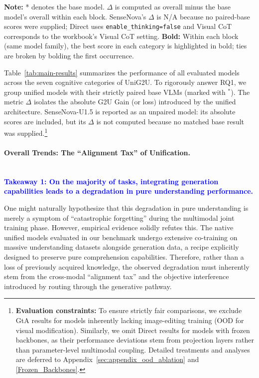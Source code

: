 \documentclass{article}
\theoremstyle{plain}
\theoremstyle{definition}
\theoremstyle{remark}
\begin{document}
\begin{table}[!t]
\vspace{2pt}

{\scriptsize \textbf{Note:} * denotes the base model. $\Delta$ is computed as overall minus the base model's overall within each block. SenseNova's $\Delta$ is N/A because no paired-base scores were supplied; Direct uses \texttt{enable\_thinking=false} and Visual CoT corresponds to the workbook's Visual CoT setting.}
{\scriptsize \textbf{Bold:} Within each block (same model family), the best score in each category is highlighted in bold; ties are broken by bolding the first occurrence.}
\end{table}


Table~\ref{tab:main-results} summarizes the performance of all evaluated models across the seven cognitive categories of UniG2U. To rigorously answer RQ1, we group unified models with their strictly paired base VLMs (marked with $^*$). The metric $\Delta$ isolates the absolute G2U Gain (or loss) introduced by the unified architecture. SenseNova-U1.5 is reported as an unpaired model: its absolute scores are included, but its $\Delta$ is not computed because no matched base result was supplied.\footnote{\textbf{Evaluation constraints:} To ensure strictly fair comparisons, we exclude GtA results for models inherently lacking image-editing training (OOD for visual modification). Similarly, we omit Direct results for models with frozen backbones, as their performance deviations stem from projection layers rather than parameter-level multimodal coupling. Detailed treatments and analyses are deferred to Appendix~\ref{sec:appendix_ood_ablation} and \ref{Frozen_Backbones}.}

\paragraph{Overall Trends: The ``Alignment Tax'' of Unification.} 
~\\
\textbf{\textcolor{blue}{Takeaway 1: On the majority of tasks, integrating generation capabilities leads to a degradation in pure understanding performance.}}

One might naturally hypothesize that this degradation in pure understanding is merely a symptom of ``catastrophic forgetting'' during the multimodal joint training phase. However, empirical evidence solidly refutes this. The native unified models evaluated in our benchmark undergo extensive co-training on massive understanding datasets alongside generation data, a recipe explicitly designed to preserve pure comprehension capabilities. Therefore, rather than a loss of previously acquired knowledge, the observed degradation must inherently stem from the cross-modal ``alignment tax'' and the objective interference introduced by routing through the generative pathway.
\end{document}
